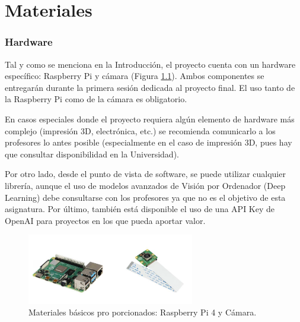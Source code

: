 \chapter{\textbf{Materiales}}
\label{chapter:materiales}

\subsection*{Hardware}
{}
\vspace{5mm}

Tal y como se menciona en la Introducción, el proyecto cuenta con un hardware específico: Raspberry Pi y cámara (Figura \ref{fig:materials}). Ambos componentes se entregarán durante la primera sesión dedicada al proyecto final. El uso tanto de la Raspberry Pi como de la cámara es obligatorio. 

En casos especiales donde el proyecto requiera algún elemento de hardware más complejo (impresión 3D, electrónica, etc.) se recomienda comunicarlo a los profesores lo antes posible (especialmente en el caso de impresión 3D, pues hay que consultar disponibilidad en la Universidad).

Por otro lado, desde el punto de vista de software, se puede utilizar cualquier librería, aunque el uso de modelos avanzados de Visión por Ordenador (Deep Learning) debe consultarse con los profesores ya que no es el objetivo de esta asignatura. Por último, también está disponible el uso de una API Key de OpenAI para proyectos en los que pueda aportar valor.

\begin{figure}[H]
    \centering
    \includegraphics[width=0.65\textwidth]{Lab_Project/template/figures/materials.png}
    \caption{Materiales básicos pro porcionados: Raspberry Pi 4 y Cámara.}
    \label{fig:materials}
\end{figure}
